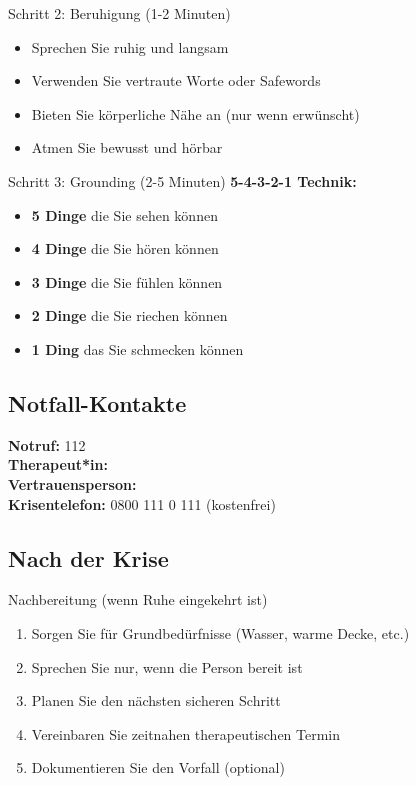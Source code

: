 \begin{ctmmOrangeBox}{Schritt 2: Beruhigung (1-2 Minuten)}
\begin{itemize}
    \item Sprechen Sie ruhig und langsam
    \item Verwenden Sie vertraute Worte oder Safewords
    \item Bieten Sie körperliche Nähe an (nur wenn erwünscht)
    \item Atmen Sie bewusst und hörbar
\end{itemize}
\end{ctmmOrangeBox}

\begin{ctmmBlueBox}{Schritt 3: Grounding (2-5 Minuten)}
\textbf{5-4-3-2-1 Technik:}
\begin{itemize}
    \item \textbf{5 Dinge} die Sie sehen können
    \item \textbf{4 Dinge} die Sie hören können  
    \item \textbf{3 Dinge} die Sie fühlen können
    \item \textbf{2 Dinge} die Sie riechen können
    \item \textbf{1 Ding} das Sie schmecken können
\end{itemize}
\end{ctmmBlueBox}

\subsection{Notfall-Kontakte}

\begin{center}
\begin{tcolorbox}[colback=ctmmYellow!20, colframe=ctmmRed, title=\textbf{WICHTIGE TELEFONNUMMERN}]
\textbf{Notruf:} 112 \\
\textbf{Therapeut*in:}  \\
\textbf{Vertrauensperson:}  \\
\textbf{Krisentelefon:} 0800 111 0 111 (kostenfrei)
\end{tcolorbox}
\end{center}

\subsection{Nach der Krise}

\begin{ctmmGreenBox}{Nachbereitung (wenn Ruhe eingekehrt ist)}
\begin{enumerate}
    \item Sorgen Sie für Grundbedürfnisse (Wasser, warme Decke, etc.)
    \item Sprechen Sie nur, wenn die Person bereit ist
    \item Planen Sie den nächsten sicheren Schritt
    \item Vereinbaren Sie zeitnahen therapeutischen Termin
    \item Dokumentieren Sie den Vorfall (optional)
\end{enumerate}
\end{ctmmGreenBox}

